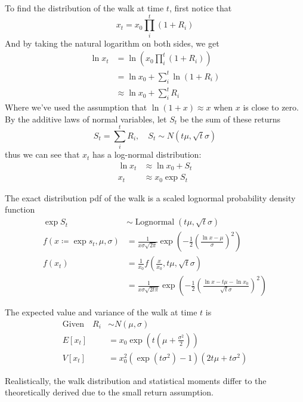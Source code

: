 \documentclass[11pt]{article}
\begin{document}
To find the distribution of the walk at time $t$, first notice that
\[
    x_t = x_0 \prod^t_i (1+R_i)
\]
And by taking the natural logarithm on both sides, we get
\begin{align*}
    \ln x_t &= \ln \left(x_0 \prod^t_i (1+R_i)\right)\\
    &= \ln x_0 + \sum_i^t \ln (1+R_i)\\
    &\approx \ln x_0 + \sum_i^t R_i
\end{align*}
Where we've used the assumption that $\ln (1+x) \approx x$ when $x$ is close to zero.
By the additive laws of normal variables, let $S_t$ be the sum of these returns
\[
    S_t = \sum_i^t R_i, \quad S_t \sim N(t\mu, \sqrt{t} \sigma)
\]
thus we can see that $x_t$ has a log-normal distribution:
\begin{align*}
    \ln x_t &\approx \ln x_0 + S_t\\
    x_t &\approx x_0 \exp{S_t}
\end{align*}

The exact distribution pdf of the walk is a scaled lognormal probability density function
\begin{align*}
    \exp S_t &\sim \operatorname{Lognormal}(t\mu, \sqrt{t}\sigma)\\
    f(x \coloneq \exp s_t, \mu, \sigma) &= \frac{1}{x \sigma \sqrt{2\pi}} \exp\left( -\frac{1}{2} \left(\frac{\ln x - \mu}{\sigma} \right)^2 \right)\\
    f(x_t) &= \frac{1}{x_0} f \left(\frac{x}{x_0}, t\mu, \sqrt{t}\sigma \right)\\
    &=\frac{1}{x\sigma\sqrt{2t\pi}} \exp\left( -\frac{1}{2} \left(\frac{\ln x - t\mu - \ln x_0}{\sqrt{t}\sigma}\right)^2 \right)
\end{align*}

The expected value and variance of the walk at time $t$ is
\begin{align*}
    \text{Given} \quad R_i &\sim N(\mu, \sigma)\\
    E[x_t] &= x_0 \exp\left( t \left(\mu + \frac{\sigma^2}{2}\right) \right)\\
    V[x_t] &= x_0^2 \left( \exp(t\sigma^2) - 1 \right) \left(2t\mu + t\sigma^2\right)
\end{align*}


Realistically, the walk distribution and statistical moments differ to the theoretically derived due to the small return assumption.
\end{document}
